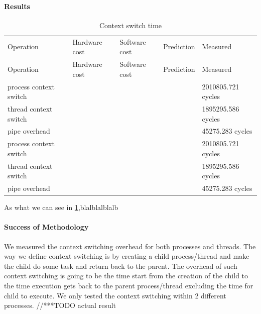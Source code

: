 \paragraph{Results}
\begin{table}
\begin{center}
\begin{tabular}{| l | l | l | l | l |}
\hline
Operation 				& Hardware cost 	& Software cost 	& Prediction 	& Measured \\



Operation 				& Hardware cost 	& Software cost 	& Prediction 	& Measured \\ \hline
process context switch 	& 				&				&			& 2010805.721 cycles \\ \hline
thread context switch 	& 				&				&			& 1895295.586 cycles \\ \hline
pipe overhead			& 				&				&			& 45275.283 cycles \\ \hline
\hline
process context switch 	& 				&				&			& 2010805.721 cycles \\
\hline
thread context switch 	& 				&				&			& 1895295.586 cycles \\ 
\hline
pipe overhead			& 				&				&			& 45275.283 cycles \\ 
\hline
\hline
\end{tabular}
\end{center}

\caption{Context switch time\label{tab:context-switch-time}}
\end{table}
As what we can see in \ref{tab:context-switch-time},blalblalblalb

\paragraph{Success of Methodology}
We measured the context switching overhead for both processes and threads. The way we define context switching is by creating a child process/thread and make the child do some task and return back to the parent. The overhead of such context switching is going to be the time start from the creation of the child to the time execution gets back to the parent process/thread excluding the time for child to execute. We only tested the context switching within 2 different processes.
//***TODO actual result



